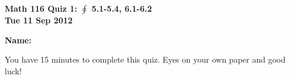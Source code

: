 \documentclass[11pt,letterpaper]{article}
\begin{document}
\flushleft
\begin{multicols}{2}


\begin{large}\textbf{Math 116 Quiz 1: $\oint$ 5.1-5.4, 6.1-6.2 \\
Tue 11 Sep 2012}\end{large}

\textbf{Name:  }\underline{\hspace{35ex}}

\vspace{.5in}

\end{multicols}

\pagestyle{empty}


\flushleft

You have 15 minutes to complete this quiz.  Eyes on your own paper and good luck!
\end{document}
